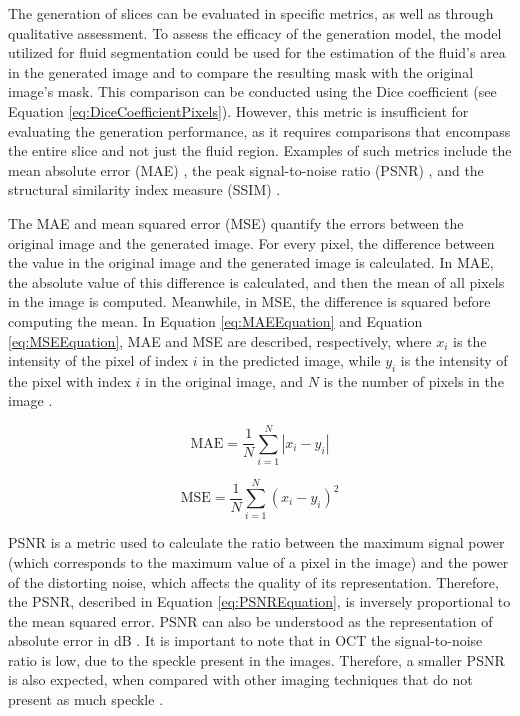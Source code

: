 The generation of slices can be evaluated in specific metrics, as well as through qualitative assessment. To assess the efficacy of the generation model, the model utilized for fluid segmentation could be used for the estimation of the fluid's area in the generated image and to compare the resulting mask with the original image's mask. This comparison can be conducted using the Dice coefficient \parencite{Lopez2023} (see Equation \ref{eq:DiceCoefficientPixels}). However, this metric is insufficient for evaluating the generation performance, as it requires comparisons that encompass the entire slice and not just the fluid region. Examples of such metrics include the mean absolute error (MAE) \parencite{Lopez2023, Wu2022, Zhang2022}, the peak signal-to-noise ratio (PSNR) \parencite{Xia2021, YChen2018, Sanchez2018, Fang2022, Nimitha2024, Kudo2019, You2020, Zhang2024, Zhang2022}, and the structural similarity index measure (SSIM) \parencite{YChen2018, Sanchez2018, Fang2022, Nimitha2024, Kudo2019, You2020, Zhang2024, Zhang2022}.
\par
The MAE and mean squared error (MSE) quantify the errors between the original image and the generated image. For every pixel, the difference between the value in the original image and the generated image is calculated. In MAE, the absolute value of this difference is calculated, and then the mean of all pixels in the image is computed. Meanwhile, in MSE, the difference is squared before computing the mean. In Equation \ref{eq:MAEEquation} and Equation \ref{eq:MSEEquation}, MAE and MSE are described, respectively, where $x_{i}$ is the intensity of the pixel of index $i$ in the predicted image, while $y_{i}$ is the intensity of the pixel with index $i$ in the original image, and $N$ is the number of pixels in the image \parencite{Sara2019, Rajkumar2016}.

\begin{equation}
	\text{MAE} = \frac{1}{N} \sum_{i=1}^{N} |x_i - y_i|
	\label{eq:MAEEquation}
\end{equation}

\begin{equation}
	\text{MSE} = \frac{1}{N} \sum_{i=1}^{N} \left( x_i - y_i \right)^{2}
	\label{eq:MSEEquation}
\end{equation}

PSNR is a metric used to calculate the ratio between the maximum signal power (which corresponds to the maximum value of a pixel in the image) and the power of the distorting noise, which affects the quality of its representation. Therefore, the PSNR, described in Equation \ref{eq:PSNREquation}, is inversely proportional to the mean squared error. PSNR can also be understood as the representation of absolute error in dB \parencite{Sara2019}. It is important to note that in OCT the signal-to-noise ratio is low, due to the speckle present in the images. Therefore, a smaller PSNR is also expected, when compared with other imaging techniques that do not present as much speckle \parencite{Bogunovic2019a}.

